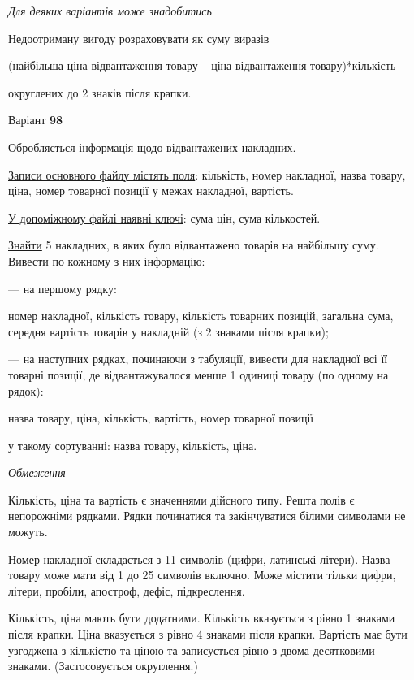 \documentclass[11pt, ukrainian]{article}
\begin{document}
\bigskip\textit{Для деяких варіантів може знадобитись}

Недоотриману вигоду розраховувати як суму виразів
{\center (найбільша ціна відвантаження товару – ціна відвантаження товару)*кількість\par}

\bigskip
{\noindent} округлених до 2 знаків після крапки.




\par
\newpage
{\center Варіант  \No \textbf { 98 }\par}
\bigskip
Обробляється інформація щодо відвантажених накладних.

\underline{Записи основного файлу містять поля}: кількість, номер накладної, назва товару, ціна, номер товарної позиції у межах накладної, вартість.

\underline{У допоміжному файлі наявні ключі}: сума цін, сума кількостей.

\underline{Знайти} 5 накладних, в яких було відвантажено товарів на найбільшу суму. Вивести по кожному з них інформацію:\par
{\noindent}--- на першому рядку:\par
номер накладної, кількість товару, кількість товарних позицій, загальна сума, середня вартість товарів у накладній (з 2 знаками після крапки);

{\noindent}--- на наступних рядках, починаючи з табуляції, вивести для накладної всі її товарні позиції, де відвантажувалося менше 1 одиниці товару (по одному на рядок):\par
назва товару, ціна, кількість, вартість, номер товарної позиції

{\noindent}у такому сортуванні: назва товару, кількість, ціна.


\bigskip\textit{Обмеження}

Кількість, ціна та вартість є значеннями дійсного типу.
Решта полів є непорожніми рядками.
Рядки починатися та закінчуватися білими символами не можуть.

Номер накладної складається з 11 символів (цифри, латинські літери).
Назва товару може мати від 1 до 25 символів включно.
Може містити тільки цифри, літери, пробіли, апостроф, дефіс, підкреслення.

Кількість, ціна мають бути додатними.
Кількість вказується з рівно 1 знаками після крапки.
Ціна вказується з рівно 4 знаками після крапки.
Вартість має бути узгоджена з кількістю та ціною та записується рівно з двома десятковими знаками.
(Застосовується округлення.)
\end{document}
